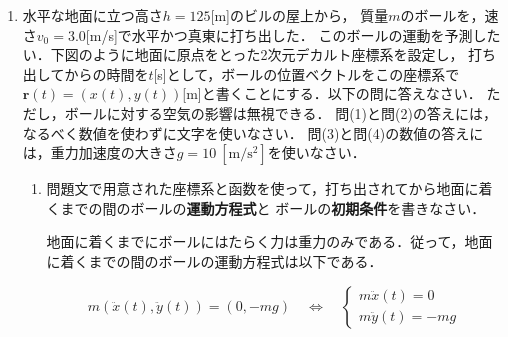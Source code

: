 \documentclass[a4paper,11pt]{ltjsarticle}
\begin{document}
\pagestyle{fancy}
\cfoot{\thepage}

\begin{enumerate}
    \item 水平な地面に立つ高さ$h=125$[m]のビルの屋上から，
    質量$m$のボールを，速さ$v_0=3.0$[m/s]で水平かつ真東に打ち出した．
    このボールの運動を予測したい．下図のように地面に原点をとった2次元デカルト座標系を設定し，
    打ち出してからの時間を$t$[s]として，ボールの位置ベクトルをこの座標系で
    $\bm{r}(t)=(x(t),y(t))$[m]と書くことにする．以下の問に答えなさい．
    ただし，ボールに対する空気の影響は無視できる．
    問(1)と問(2)の答えには，なるべく数値を使わずに文字を使いなさい．
    問(3)と問(4)の数値の答えには，重力加速度の大きさ$g=10\ [\mathrm{m/s^2}]$を使いなさい．

    \begin{center}
    \end{center}
    
    \begin{enumerate}[label=(\arabic*)]
        \item 問題文で用意された座標系と函数を使って，打ち出されてから地面に着くまでの間のボールの\textbf{運動方程式}と
        ボールの\textbf{初期条件}を書きなさい．

        \vspace{5pt}        

        地面に着くまでにボールにはたらく力は重力のみである．従って，地面に着くまでの間のボールの運動方程式は以下である．

        \begin{equation*}
            m(\ddot{x}(t),\ddot{y}(t))=(0,-mg) \quad \Leftrightarrow \quad
            \begin{cases}
                m \ddot{x}(t)=0 \\
                m \ddot{y}(t)=-mg
            \end{cases}
        \end{equation*}


\end{enumerate}
\end{enumerate}
\end{document}
